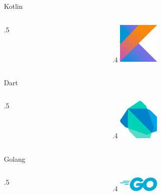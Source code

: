 \begin{frame}{Kotlin}
    \begin{columns}
        \begin{column}{.5\framewidth}

        \end{column}
        \begin{column}{.4\framewidth}
            \includegraphics[width=2cm]{resources/logos/kotlin}
        \end{column}
    \end{columns}
\end{frame}
\begin{frame}{Dart}
    \begin{columns}
        \begin{column}{.5\framewidth}

        \end{column}
        \begin{column}{.4\framewidth}
            \includegraphics[width=2cm]{resources/logos/dart}
        \end{column}
    \end{columns}
\end{frame}
\begin{frame}{Golang}
    \begin{columns}
        \begin{column}{.5\framewidth}

        \end{column}
        \begin{column}{.4\framewidth}
            \includegraphics[width=2cm]{resources/logos/go}
        \end{column}
    \end{columns}
\end{frame}

